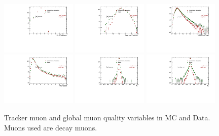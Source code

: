 \begin{figure}
  \includegraphics[width=0.32\textwidth]{Chapters/aCorrection/PixelLayer.pdf}
  \includegraphics[width=0.32\textwidth]{Chapters/aCorrection/InnerTrackHits.pdf}
  \includegraphics[width=0.32\textwidth]{Chapters/aCorrection/Chi2NdfInner.pdf}
  \includegraphics[width=0.32\textwidth]{Chapters/aCorrection/Chi2NdfGlobal.pdf}
  \includegraphics[width=0.32\textwidth]{Chapters/aCorrection/Dxy.pdf}
  \includegraphics[width=0.32\textwidth]{Chapters/aCorrection/Dz.pdf}
 \caption{Tracker muon and global muon quality variables in MC and
   Data. Muons used are \Jpsi decay muons.}
 \label{fig:muonIDplots} 
\end{figure}

